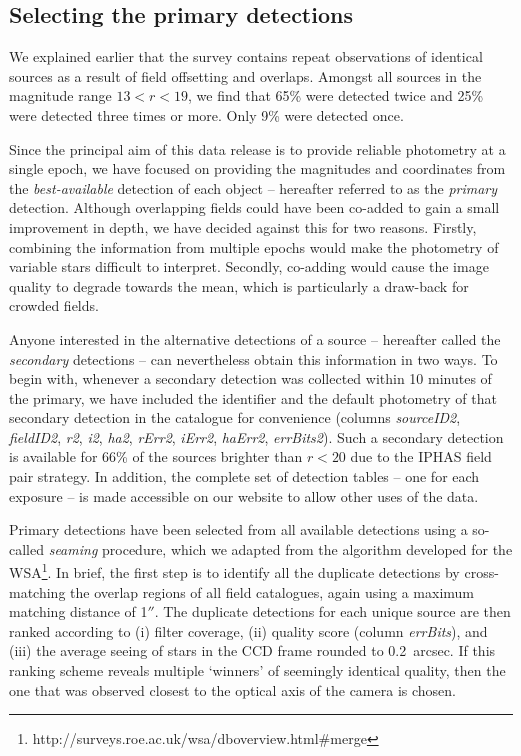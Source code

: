 \documentclass[useAMS,usenatbib]{mn2e}
\def\arcsec{$''$}
\begin{document}
\subsection{Selecting the primary detections}

We explained earlier that the survey contains repeat observations
of identical sources as a result of field offsetting and overlaps.
Amongst all sources in the magnitude range $13<r<19$,
we find that 65\% were detected twice and 25\% were detected three times or more.
Only 9\% were detected once.

Since the principal aim of this data release is to provide 
reliable photometry at a single epoch,
we have focused on providing the magnitudes
and coordinates from the \emph{best-available} 
detection of each object -- 
hereafter referred to as the \emph{primary} detection.
Although overlapping fields could have been co-added 
to gain a small improvement in depth, 
we have decided against this for two reasons.
Firstly, combining the information from multiple epochs
would make the photometry of variable stars difficult to interpret.
Secondly, co-adding would cause the image quality to degrade towards the mean,
which is particularly a draw-back for crowded fields.

Anyone interested in the alternative detections of a source
-- hereafter called the \emph{secondary} detections --
can nevertheless obtain this information in two ways.
To begin with, whenever a secondary detection was collected 
within 10 minutes of the primary,
we have included the identifier and the default photometry
of that secondary detection
in the catalogue for convenience
(columns \emph{sourceID2}, \emph{fieldID2}, 
\emph{r2}, \emph{i2}, \emph{ha2},
\emph{rErr2}, \emph{iErr2}, \emph{haErr2}, \emph{errBits2}).
Such a secondary detection is available for 66\% of the sources brighter than $r<20$
due to the IPHAS field pair strategy.
In addition, the complete set of detection tables -- one for each exposure -- 
is made accessible on our website to allow other uses of the data.

Primary detections have been selected from all available detections using a so-called \emph{seaming} procedure,
which we adapted from the algorithm developed for the WSA\footnote{http://surveys.roe.ac.uk/wsa/dboverview.html\#merge}.
In brief, the first step is to identify all the duplicate detections
by cross-matching the overlap regions of all field catalogues,
again using a maximum matching distance of 1\arcsec.
The duplicate detections for each unique source are then ranked according to
(i) filter coverage, (ii) quality score (column \emph{errBits}),
and (iii) the average seeing of stars in the CCD frame rounded to 0.2~arcsec.
If this ranking scheme reveals multiple `winners' of seemingly identical quality,
then the one that was observed closest to the optical axis of the camera is chosen.
\end{document}
